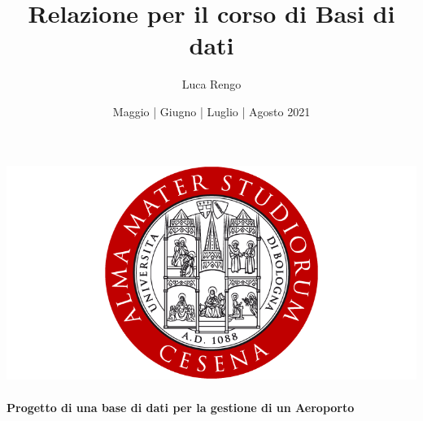 \documentclass[a4paper, 12pt]{article} %
\begin{document}
	
	\title{Relazione per il corso di Basi di dati}
	\author{Luca Rengo}
	\date{Maggio | Giugno | Luglio | Agosto 2021}
		
	\makeatletter
	\begin{titlepage}
		\begin{center}
			\includegraphics[width=0.7\linewidth]{img/alma_mater_studiorum_cesena_logo.png}\\[4ex]
			{\Huge  \@title }\\[1ex] 
			\textbf{\LARGE Progetto di una base di dati per la gestione di un Aeroporto}\\[2ex] 
			{\large  \@author}\\[2ex] 
			{\large \@date}
		\end{center}
	\end{titlepage}

	\makeatother
	\thispagestyle{empty}
	
	
	\let\cleardoublepage\clearpage
	\tableofcontents
	\setcounter{page}{2}
	
	
	\fancyhf{}

	
	
	
	
	
	
	
	
	
	
	
	
	
\end{document}
